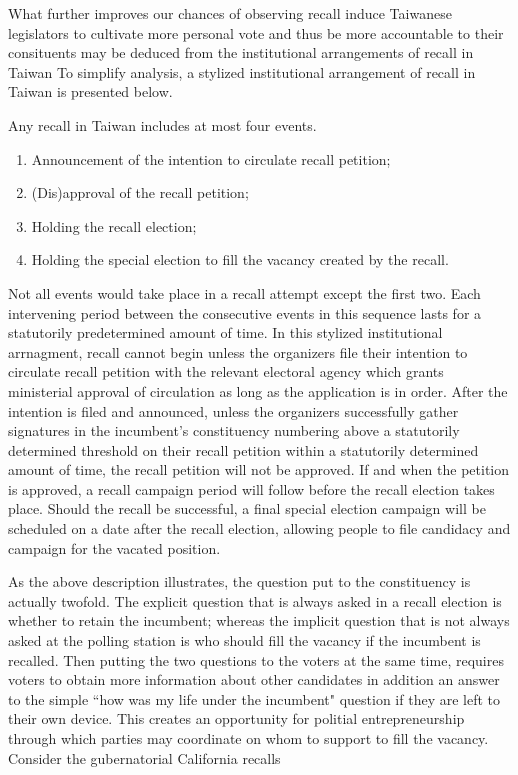 \documentclass[hyphens, crop=false]{standalone}
\begin{document}
	What further improves our chances of observing recall induce Taiwanese legislators
	to cultivate more personal vote and thus be more accountable to their consituents
	may be deduced from the institutional arrangements of recall in Taiwan
	To simplify analysis, a stylized institutional arrangement of recall in Taiwan is presented below.

	Any recall in Taiwan includes at most four events.
	\begin{enumerate}
		\item 
		Announcement of the intention to circulate recall petition;
		\item 
		(Dis)approval of the recall petition;
		\item 
		Holding the recall election;
		\item
		Holding the special election to fill the vacancy created by the recall.
	\end{enumerate}
	Not all events would take place in a recall attempt except the first two.
	Each intervening period between the consecutive events in this sequence
	lasts for a statutorily predetermined amount of time.
	In this stylized institutional arrnagment,
	recall cannot begin unless the organizers file their intention to circulate recall petition
	with the relevant electoral agency
	which grants ministerial approval of circulation as long as the application is in order.
	After the intention is filed and announced,
	unless
	the organizers successfully gather signatures in the incumbent's constituency
	numbering above a statutorily determined threshold on their recall petition
	within a statutorily determined amount of time,
	the recall petition will not be approved.
	If and when the petition is approved,
	a recall campaign period will follow before the recall election takes place.
	Should the recall be successful,
	a final special election campaign will be scheduled on a date after the recall election,
	allowing people to file candidacy and campaign for the vacated position.
	
	As the above description illustrates,
	the question put to the constituency is actually twofold.
	The explicit question that is always asked in a recall election is
	whether to retain the incumbent;
	whereas the implicit question that is not always asked at the polling station is
	who should fill the vacancy if the incumbent is recalled.
	Then putting the two questions to the voters at the same time,
	requires voters to obtain more information about other candidates
	in addition an answer to the simple ``how was my life under the incumbent" question
	if they are left to their own device.
	This creates an opportunity for politial entrepreneurship
	through which parties may coordinate on whom to support to
	fill the vacancy.
	Consider the gubernatorial California recalls
	
\end{document}
